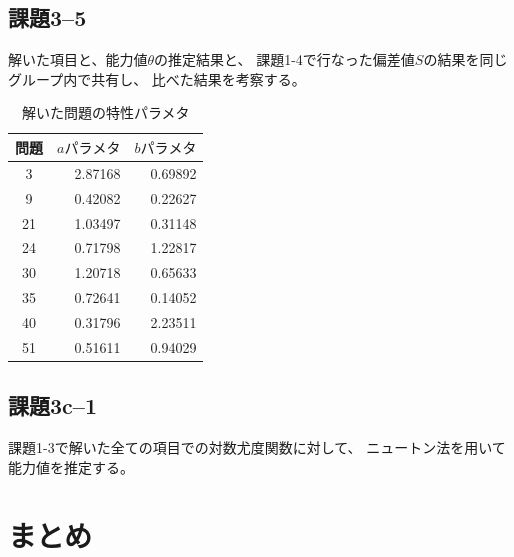 \documentclass[12pt]{jarticle}
\begin{document}
\subsection{課題3–5}
\begin{shadebox}
    解いた項目と、能力値$\theta$の推定結果と、
    課題1-4で行なった偏差値$S$の結果を同じグループ内で共有し、
    比べた結果を考察する。
\end{shadebox}


\begin{table}[htb]
    \begin{center}
        \caption{解いた問題の特性パラメタ}
        \begin{tabular}{|c|r|r|}
            \hline
            問題 & $aパラメタ$ & $bパラメタ$ \\
            \hline
            3    & 2.87168     & 0.69892     \\
            9    & 0.42082     & 0.22627     \\
            21   & 1.03497     & 0.31148     \\
            24   & 0.71798     & 1.22817     \\
            30   & 1.20718     & 0.65633     \\
            35   & 0.72641     & 0.14052     \\
            40   & 0.31796     & 2.23511     \\
            51   & 0.51611     & 0.94029     \\
            \hline
        \end{tabular}
    \end{center}
\end{table}


\subsection{課題3c–1}
\begin{shadebox}
    課題1-3で解いた全ての項目での対数尤度関数に対して、
    ニュートン法を用いて能力値を推定する。
\end{shadebox}


\section{まとめ}



\clearpage
\appendix
\end{document}
